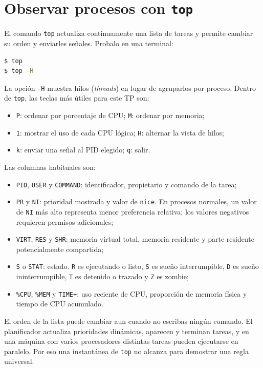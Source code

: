 \documentclass[11pt,a4paper]{article}
\begin{document}
\section{Observar procesos con \texttt{top}}

El comando \texttt{top} actualiza continuamente una lista de tareas y
permite cambiar su orden y enviarles señales. Probalo en una terminal:

\begin{lstlisting}[language=bash]
$ top
$ top -H
\end{lstlisting}

La opción \texttt{-H} muestra hilos (\emph{threads}) en lugar de agruparlos
por proceso. Dentro de \texttt{top}, las teclas más útiles para este TP son:

\begin{itemize}
  \item \texttt{P}: ordenar por porcentaje de CPU; \texttt{M}: ordenar por
  memoria;
  \item \texttt{1}: mostrar el uso de cada CPU lógica; \texttt{H}: alternar
  la vista de hilos;
  \item \texttt{k}: enviar una señal al PID elegido; \texttt{q}: salir.
\end{itemize}

Las columnas habituales son:

\begin{itemize}
  \item \texttt{PID}, \texttt{USER} y \texttt{COMMAND}: identificador,
  propietario y comando de la tarea;
  \item \texttt{PR} y \texttt{NI}: prioridad mostrada y valor de \texttt{nice}.
  En procesos normales, un valor de \texttt{NI} más alto representa menor
  preferencia relativa; los valores negativos requieren permisos adicionales;
  \item \texttt{VIRT}, \texttt{RES} y \texttt{SHR}: memoria virtual total,
  memoria residente y parte residente potencialmente compartida;
  \item \texttt{S} o \texttt{STAT}: estado. \texttt{R} es ejecutando o listo,
  \texttt{S} es sueño interrumpible, \texttt{D} es sueño ininterrumpible,
  \texttt{T} es detenido o trazado y \texttt{Z} es zombie;
  \item \texttt{\%CPU}, \texttt{\%MEM} y \texttt{TIME+}: uso reciente de
  CPU, proporción de memoria física y tiempo de CPU acumulado.
\end{itemize}

El orden de la lista puede cambiar aun cuando no escribas ningún comando.
El planificador actualiza prioridades dinámicas, aparecen y terminan tareas,
y en una máquina con varios procesadores distintas tareas pueden ejecutarse en
paralelo. Por eso una instantánea de \texttt{top} no alcanza para demostrar
una regla universal.
\end{document}
